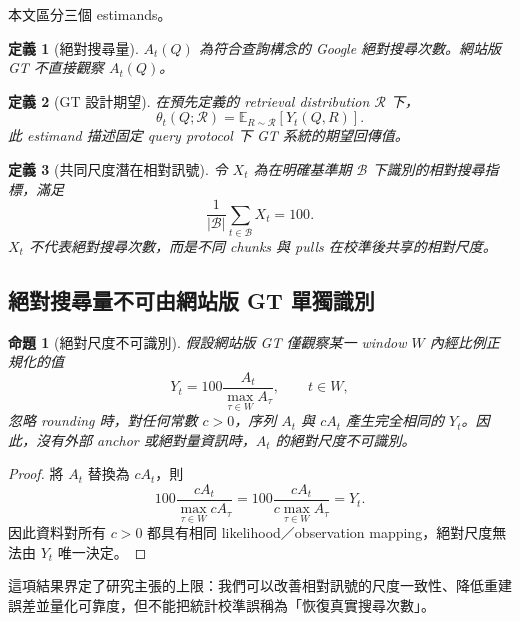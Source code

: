 \documentclass[12pt,a4paper,oneside]{article}
\newtheorem{proposition}{命題}[section]
\newtheorem{definition}{定義}[section]
\newcommand{\E}{\mathbb{E}}
\begin{document}
本文區分三個 estimands。

\begin{definition}[絕對搜尋量]
$A_t(Q)$ 為符合查詢構念的 Google 絕對搜尋次數。網站版 GT 不直接觀察 $A_t(Q)$。
\end{definition}

\begin{definition}[GT 設計期望]
在預先定義的 retrieval distribution $\mathcal{R}$ 下，
\begin{equation}
\theta_t(Q;\mathcal{R})
=\E_{R\sim\mathcal{R}}\left[Y_t(Q,R)\right].
\label{eq:designestimand}
\end{equation}
此 estimand 描述固定 query protocol 下 GT 系統的期望回傳值。
\end{definition}

\begin{definition}[共同尺度潛在相對訊號]
令 $X_t$ 為在明確基準期 $\mathcal{B}$ 下識別的相對搜尋指標，滿足
\begin{equation}
\frac{1}{|\mathcal{B}|}\sum_{t\in\mathcal{B}}X_t=100.
\label{eq:baselineidentification}
\end{equation}
$X_t$ 不代表絕對搜尋次數，而是不同 chunks 與 pulls 在校準後共享的相對尺度。
\end{definition}

\subsection{絕對搜尋量不可由網站版 GT 單獨識別}

\begin{proposition}[絕對尺度不可識別]
假設網站版 GT 僅觀察某一 window $W$ 內經比例正規化的值
\begin{equation}
Y_t=100\frac{A_t}{\max_{\tau\in W}A_\tau},\qquad t\in W,
\end{equation}
忽略 rounding 時，對任何常數 $c>0$，序列 $A_t$ 與 $cA_t$ 產生完全相同的 $Y_t$。因此，沒有外部 anchor 或絕對量資訊時，$A_t$ 的絕對尺度不可識別。
\end{proposition}

\begin{proof}
將 $A_t$ 替換為 $cA_t$，則
\[
100\frac{cA_t}{\max_{\tau\in W}cA_\tau}
=100\frac{cA_t}{c\max_{\tau\in W}A_\tau}
=Y_t.
\]
因此資料對所有 $c>0$ 都具有相同 likelihood／observation mapping，絕對尺度無法由 $Y_t$ 唯一決定。
\end{proof}

這項結果界定了研究主張的上限：我們可以改善相對訊號的尺度一致性、降低重建誤差並量化可靠度，但不能把統計校準誤稱為「恢復真實搜尋次數」。
\end{document}
